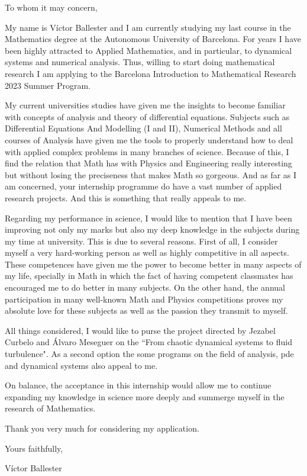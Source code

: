 \documentclass{letter}
\date{\today}
\newcommand{\intern}{Barcelona Introduction to Mathematical Research 2023 Summer Program}
\begin{document}
\begin{letter}
  \hfill

  \opening{To whom it may concern,} %
  \medskip

  My name is Víctor Ballester and I am currently studying my last course in the Mathematics degree at the Autonomous University of Barcelona. For years I have been highly attracted to Applied Mathematics, and in particular, to dynamical systems and numerical analysis. Thus, willing to start doing mathematical research I am applying to the \intern.

  My current universities studies have given me the insights to become familiar with concepts of analysis and theory of differential equations. Subjects such as Differential Equations And Modelling (I and II), Numerical Methods and all courses of Analysis have given me the tools to properly understand how to deal with applied complex problems in many branches of science. Because of this, I find the relation that Math has with Physics and Engineering really interesting but without losing the preciseness that makes Math so gorgeous. And as far as I am concerned, your internship programme do have a vast number of applied research projects. And this is something that really appeals to me.

  Regarding my performance in science, I would like to mention that I have been improving not only my marks but also my deep knowledge in the subjects during my time at university. This is due to several reasons. First of all, I consider myself a very hard-working person as well as highly competitive in all aspects. These competences have given me the power to become better in many aspects of my life, specially in Math in which the fact of having competent classmates has encouraged me to do better in many subjects. On the other hand, the annual participation in many well-known Math and Physics competitions proves my absolute love for these subjects as well as the passion they transmit to myself.

  All things considered, I would like to purse the project directed by Jezabel Curbelo and Álvaro Meseguer on the ``From chaotic dynamical systems to fluid turbulence". As a second option the some programs on the field of analysis, pde and dynamical systems also appeal to me.

  On balance, the acceptance in this internship would allow me to continue expanding my knowledge in science more deeply and summerge myself in the research of Mathematics.

  Thank you very much for considering my application.
  \bigskip

  Yours faithfully,

  Víctor Ballester

\end{letter}
\end{document}
